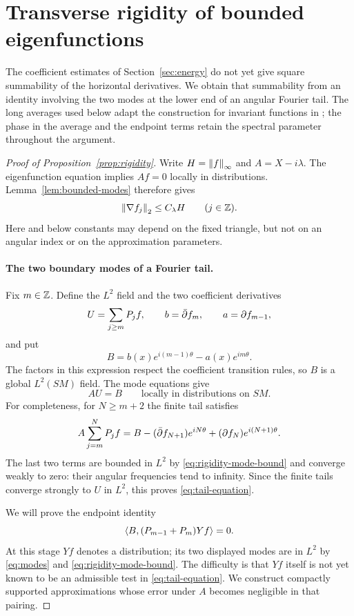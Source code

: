 \section{Transverse rigidity of bounded eigenfunctions}\label{sec:rigidity}

The coefficient estimates of Section~\ref{sec:energy} do not yet give
square summability of the horizontal derivatives.  We obtain that summability
from an identity involving the two modes at the lower end of an angular
Fourier tail.
The long averages used below adapt the construction for invariant functions
in \cite[Sections~4--5]{Companion}; the phase in the average and the endpoint
terms retain the spectral parameter throughout the argument.

\begin{proof}[Proof of Proposition~\ref{prop:rigidity}]
Write $H=\left\lVert f\right\rVert_\infty$ and $A=X-i\lambda$.  The eigenfunction equation
implies $Af=0$ locally in distributions.  Lemma~\ref{lem:bounded-modes}
therefore gives
\begin{equation}\label{eq:rigidity-mode-bound}
 \left\lVert\nabla f_j\right\rVert_2\le C_\lambda H
 \qquad(j\in\mathbb Z).
\end{equation}
Here and below constants may depend on the fixed triangle, but not on an
angular index or on the approximation parameters.

\paragraph{The two boundary modes of a Fourier tail.}
Fix $m\in\mathbb Z$.  Define the $L^2$ field and the two coefficient derivatives
\[
 U=\sum_{j\ge m}P_jf,\qquad
 b=\bar\partial f_m,\qquad a=\partial f_{m-1},
\]
and put
\[
 B=b(x)e^{i(m-1)\theta}-a(x)e^{im\theta}.
\]
The factors in this expression respect the coefficient transition rules,
so $B$ is a global $L^2(SM)$ field.  The mode equations give
\begin{equation}\label{eq:tail-equation}
 AU=B\qquad\text{locally in distributions on }SM.
\end{equation}
For completeness, for $N\ge m+2$ the finite tail satisfies
\[
 A\sum_{j=m}^N P_jf
 =B-(\bar\partial f_{N+1})e^{iN\theta}
      +(\partial f_N)e^{i(N+1)\theta}.
\]
The last two terms are bounded in $L^2$ by
\eqref{eq:rigidity-mode-bound} and converge weakly to zero: their angular
frequencies tend to infinity.  Since the finite tails converge strongly
to $U$ in $L^2$, this proves \eqref{eq:tail-equation}.

We will prove the endpoint identity
\begin{equation}\label{eq:endpoint-identity}
 \left\langle B,(P_{m-1}+P_m)Yf\right\rangle=0.
\end{equation}
At this stage $Yf$ denotes a distribution; its two displayed modes are
in $L^2$ by \eqref{eq:modes} and \eqref{eq:rigidity-mode-bound}.
The difficulty is that $Yf$ itself is not yet known to be an admissible
test in \eqref{eq:tail-equation}.  We construct compactly supported
approximations whose error under $A$ becomes negligible in that pairing.


\end{proof}
